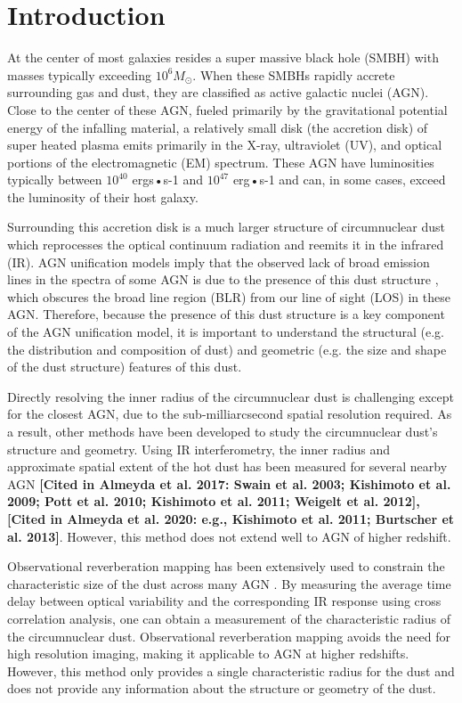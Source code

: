 \graphicspath{{figures/intro}}
\section{Introduction}  \label{sec:intro}
\par At the center of most galaxies resides a super massive black hole (SMBH) with masses typically exceeding $10^6M_\odot$. When these SMBHs rapidly accrete surrounding gas and dust, they are classified as active galactic nuclei (AGN). Close to the center of these AGN, fueled primarily by the gravitational potential energy of the infalling material, a relatively small disk (the accretion disk) of super heated plasma emits primarily in the X-ray, ultraviolet (UV), and optical portions of the electromagnetic (EM) spectrum. These AGN have luminosities typically between $10^{40}$ ergs•s-1 and $10^{47}$ erg•s-1 and can, in some cases, exceed the luminosity of their host galaxy.

\par Surrounding this accretion disk is a much larger structure of circumnuclear dust which reprocesses the optical continuum radiation and reemits it in the infrared (IR). AGN unification models imply that the observed lack of broad emission lines in the spectra of some AGN is due to the presence of this dust structure , which obscures the broad line region (BLR) from our line of sight (LOS) in these AGN. Therefore, because the presence of this dust structure is a key component of the AGN unification model, it is important to understand the structural (e.g. the distribution and composition of dust) and geometric (e.g. the size and shape of the dust structure) features of this dust.

\par Directly resolving the inner radius of the circumnuclear dust is challenging except for the closest AGN, due to the sub-milliarcsecond spatial resolution required. As a result, other methods have been developed to study the circumnuclear dust's structure and geometry. Using IR interferometry, the inner radius and approximate spatial extent of the hot dust has been measured for several nearby AGN {\bf [Cited in Almeyda et al. 2017: Swain et al. 2003; Kishimoto et al. 2009; Pott et al. 2010; Kishimoto et al. 2011; Weigelt et al. 2012], [Cited in Almeyda et al. 2020: e.g., Kishimoto et al. 2011; Burtscher et al. 2013]}. However, this method does not extend well to AGN of higher redshift.

\par Observational reverberation mapping has been extensively used to constrain the characteristic size of the dust across many AGN . By measuring the average time delay between optical variability and the corresponding IR response using cross correlation analysis, one can obtain a measurement of the characteristic radius of the circumnuclear dust. Observational reverberation mapping avoids the need for high resolution imaging, making it applicable to AGN at higher redshifts. However, this method only provides a single characteristic radius for the dust and does not provide any information about the structure or geometry of the dust.

